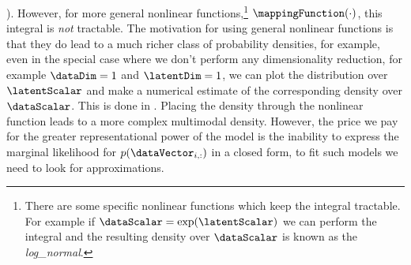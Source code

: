).  However, for more general nonlinear
functions,\footnote{There are some specific nonlinear functions which
  keep the integral tractable. For example if
  $\dataScalar=\exp(\latentScalar)$ we can perform the integral and
  the resulting density over $\dataScalar$ is known as the
  \emph{\gls{log_normal}}.}  $\mappingFunction(\cdot)$, this integral
is \emph{not} tractable. The motivation for using general nonlinear
functions is that they do lead to a much richer class of probability
densities, for example, even in the special case where we don't
perform any dimensionality reduction, for example $\dataDim=1$ and
$\latentDim=1$, we can plot the distribution over $\latentScalar$ and
make a numerical estimate of the corresponding density over
$\dataScalar$. This is done in
. Placing the density through the
nonlinear function leads to a more complex multimodal
density. However, the price we pay for the greater representational
power of the model is the inability to express the marginal likelihood
for $p(\dataVector_{i, :})$ in a closed form, to fit such models we
need to look for approximations.
% 

